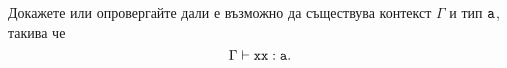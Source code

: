 
\begin{problem}
  Докажете или опровергайте дали е възможно да съществува контекст $\Gamma$ и тип $\texttt{a}$, такива че
  \[\Gamma \vdash \texttt{xx}:\texttt{a}.\]
\end{problem}




